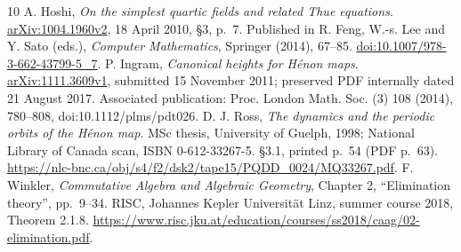 \documentclass{jT}
\begin{document}
\begin{thebibliography}{10}
 A. Hoshi, \emph{On the simplest quartic fields and related Thue equations}. \href{https://arxiv.org/abs/1004.1960v2}{arXiv:1004.1960v2}, 18 April 2010, \S3, p.~7. Published in R. Feng, W.-s. Lee and Y. Sato (eds.), \emph{Computer Mathematics}, Springer (2014), 67--85. \href{https://doi.org/10.1007/978-3-662-43799-5_7}{doi:10.1007/978-3-662-43799-5\_7}.
 P. Ingram, \emph{Canonical heights for H\'enon maps}. \href{https://arxiv.org/abs/1111.3609v1}{arXiv:1111.3609v1}, submitted 15 November 2011; preserved PDF internally dated 21 August 2017. Associated publication: Proc. London Math. Soc. (3) 108 (2014), 780--808, doi:10.1112/plms/pdt026.
 D. J. Ross, \emph{The dynamics and the periodic orbits of the H\'enon map}. MSc thesis, University of Guelph, 1998; National Library of Canada scan, ISBN 0-612-33267-5. \S3.1, printed p.~54 (PDF p.~63). \url{https://nlc-bnc.ca/obj/s4/f2/dsk2/tape15/PQDD_0024/MQ33267.pdf}.
 F. Winkler, \emph{Commutative Algebra and Algebraic Geometry}, Chapter 2, ``Elimination theory'', pp.~9--34. RISC, Johannes Kepler Universit\"at Linz, summer course 2018, Theorem 2.1.8. \url{https://www.risc.jku.at/education/courses/ss2018/caag/02-elimination.pdf}.
\end{thebibliography}
\end{document}
